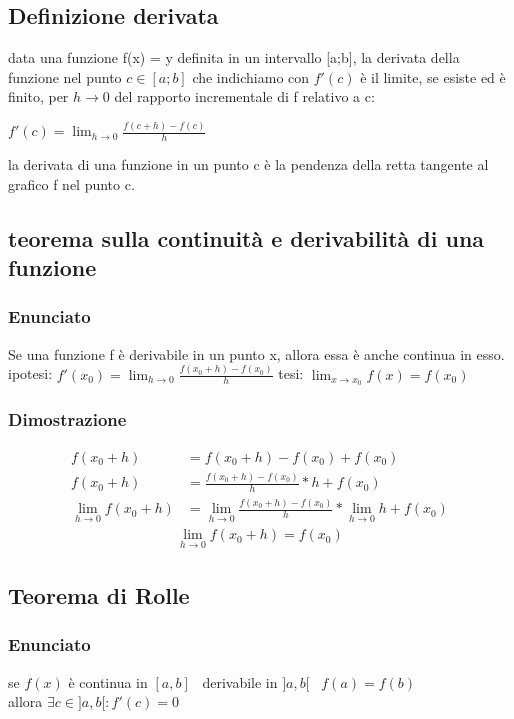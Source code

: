 \documentclass[a4paper,11pt]{article}
\begin{document}
\subsection{Definizione derivata}
data una funzione f(x) = y definita in un intervallo [a;b], la derivata della funzione nel punto \(c \in [a;b]\) che indichiamo con \(f'(c)\) è il limite, se esiste ed è finito, per \(h \to 0\) del rapporto incrementale di f relativo a c:
\begin{center}
    \(
    f'(c) = \lim_{h \to 0} \frac{f(c+h)-f(c)}{h}
    \)
\end{center}
la derivata di una funzione in un punto c è la pendenza della retta tangente al grafico f nel punto c.

\subsection{teorema sulla continuità e derivabilità di una funzione}

\subsubsection{Enunciato}
Se una funzione f è derivabile in un punto x, allora essa è anche continua in esso.
ipotesi: \(  f'(x_0) = \lim_{h \to 0} \frac{f(x_0+h)-f(x_0)}{h}  \)
tesi: \( \lim_{x \to x_0} f(x) = f(x_0) \)

\subsubsection{Dimostrazione}
\begin{align*}
    f(x_0 + h) &= f(x_0 + h) - f(x_0) + f(x_0) 
    \\
    f(x_0 + h) &= \frac{f(x_0 + h) - f(x_0)}{h} * h + f(x_0)
    \\
    \lim_{h \to 0} f(x_0 + h) &= \lim_{h \to 0} \frac{f(x_0 + h) - f(x_0)}{h} * \lim_{h \to 0} h + f(x_0)  
\end{align*}
\begin{align*}
    \lim_{h \to 0} f(x_0 + h) = f(x_0) 
\end{align*}

\subsection{Teorema di Rolle} 
\subsubsection{Enunciato}
se \(f(x)\) è continua in \([a,b]\) \, derivabile in \(]a,b[\) \, \label{sec:3Rolle} \(f(a) = f(b)\)
\\
allora \( \exists c \in ]a,b[ : f' (c) = 0 \)
\end{document}
